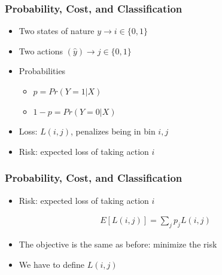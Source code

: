 \documentclass[
  shownotes,
  xcolor={svgnames},
  hyperref={colorlinks,citecolor=DarkBlue,linkcolor=DarkRed,urlcolor=DarkBlue}
  , aspectratio=169]{beamer}
\begin{document}
\begin{frame}[fragile]
\frametitle{Probability, Cost, and Classification}

\begin{itemize}
  \item Two states of nature $y \rightarrow i\in\{0,1\}$
  \medskip
  \item Two actions $(\hat{y}) \rightarrow j\in \{0,1\}$
  \medskip
  \item Probabilities
  \begin{itemize}
    \item $p=Pr(Y=1|X)$
    \item $1-p=Pr(Y=0|X)$
  \end{itemize}
  \medskip
  \item Loss: $L(i,j)$, penalizes being in bin $i,j$
  \item Risk: expected loss of taking action $i$
\end{itemize}


\end{frame}
\begin{frame}[fragile]
\frametitle{Probability, Cost, and Classification}

\begin{itemize}
  \item Risk: expected loss of taking action $i$
\end{itemize}

\begin{align}
E[L(i,j)] = \sum_j p_j L(i,j)
\end{align}

\begin{itemize}
  \item The objective is the same as before: minimize the risk
  \item We have to define $L(i,j)$
\end{itemize}

\end{frame}
\end{document}
